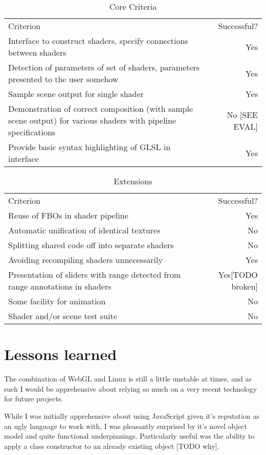\documentclass[12pt,twoside,notitlepage]{report}
\begin{document}
\begin{table}
\begin{tabular}{p{9cm} | r}
Criterion & Successful? \\
Interface to construct shaders, specify connections between shaders & Yes \\
Detection of parameters of set of shaders, parameters presented to the user somehow & Yes \\
Sample scene output for single shader & Yes \\
Demonstration of correct composition (with sample scene output) for various shaders with pipeline specifications & No [SEE EVAL]\\
Provide basic syntax highlighting of GLSL in interface & Yes \\
\end{tabular}
\label{core_t}
\caption{Core Criteria}
\end{table}
\begin{table}
\begin{tabular}{p{9cm} | r}
Criterion & Successful? \\
Reuse of FBOs in shader pipeline & Yes \\
Automatic unification of identical textures & No \footnotemark[1] \\
Splitting shared code off into separate shaders & No \footnotemark[2] \\
Avoiding recompiling shaders unnecessarily & Yes \\
Presentation of sliders with range detected from range annotations in shaders & Yes[TODO broken]\\
Some facility for animation & No \\
Shader and/or scene test suite & No \\
\end{tabular}
\label{ext_t}
\caption{Extensions}
\end{table}
\section{Lessons learned}
The combination of WebGL and Linux is still a little unstable at times, and as such I would be apprehensive about relying so much on a very recent technology for future projects.

While I was initially apprehensive about using JavaScript given it's reputation as an ugly language to work with, I was pleasantly surprised by it's novel object model and quite functional underpinnings. Particularly useful was the ability to apply a class constructor to an already existing object [TODO why].
\end{document}

